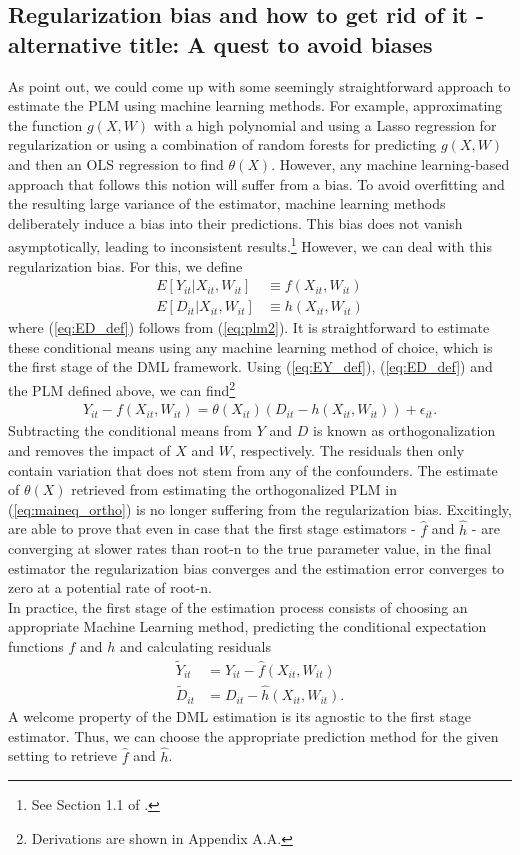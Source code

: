 \subsection{Regularization bias and how to get rid of it - alternative title: A quest to avoid biases}
As \cite{DML2017} point out, we could come up with some seemingly straightforward approach to estimate the PLM using machine learning methods. For example, approximating the function $g(X, W)$ with a high polynomial and using a Lasso regression for regularization or using a combination of random forests for predicting $g(X, W)$ and then an OLS regression to find $\theta(X)$. However, any machine learning-based approach that follows this notion will suffer from a bias. To avoid overfitting and the resulting large variance of the estimator, machine learning methods deliberately induce a bias into their predictions. This bias does not vanish asymptotically, leading to inconsistent results.\footnote{See Section 1.1 of \cite{DML2017}.} However, we can deal with this regularization bias. For this, we define 
\begin{align}
    E[Y_{it}|X_{it}, W_{it}] &\equiv f(X_{it}, W_{it}) \label{eq:EY_def}\\ 
    E[D_{it}|X_{it}, W_{it}] &\equiv h(X_{it}, W_{it}) \label{eq:ED_def}
\end{align}
where (\ref{eq:ED_def}) follows from (\ref{eq:plm2}). It is straightforward to estimate these conditional means using any machine learning method of choice, which is the first stage of the DML framework. Using (\ref{eq:EY_def}), (\ref{eq:ED_def}) and the PLM defined above, we can find\footnote{Derivations are shown in Appendix A.A.}
\begin{align}
    Y_{it}-f(X_{it}, W_{it})=\theta(X_{it})(D_{it}-h(X_{it}, W_{it})) + \epsilon_{it}. \label{eq:maineq_ortho}
\end{align}
Subtracting the conditional means from $Y$ and $D$ is known as orthogonalization and removes the impact of $X$ and $W$, respectively. The residuals then only contain variation that does not stem from any of the confounders. The estimate of $\theta(X)$ retrieved from  estimating the orthogonalized PLM in (\ref{eq:maineq_ortho}) is no longer suffering from the regularization bias. Excitingly, \cite{DML2017} are able to prove that even in case that the first stage estimators - $\hat{f}$ and $\hat{h}$ - are converging at slower rates than root-n to the true parameter value, in the final estimator the regularization bias converges and the estimation error converges to zero at a potential rate of root-n. \\
In practice, the first stage of the estimation process consists of choosing an appropriate Machine Learning method, predicting the conditional expectation functions $f$ and $h$ and calculating residuals 
\begin{align*} 
    \tilde{Y}_{it}&=Y_{it}-\hat{f}(X_{it}, W_{it}) \\ 
    \tilde{D}_{it}&=D_{it}-\hat{h}(X_{it}, W_{it}).
\end{align*}
A welcome property of the DML estimation is its agnostic to the first stage estimator. Thus, we can choose the appropriate prediction method for the given setting to retrieve $\hat{f}$ and $\hat{h}$.

